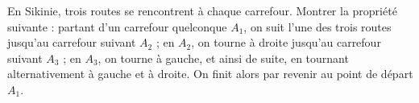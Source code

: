 En Sikinie, trois routes se rencontrent à chaque carrefour. Montrer la propriété suivante : partant d'un carrefour quelconque $A_1$, on suit l'une des trois routes jusqu'au carrefour suivant $A_2$ ; en $A_2$, on tourne à droite jusqu'au carrefour suivant $A_3$ ; en $A_3$, on tourne à gauche, et ainsi de suite, en tournant alternativement à gauche et à droite. On finit alors par revenir au point de départ $A_1$.
